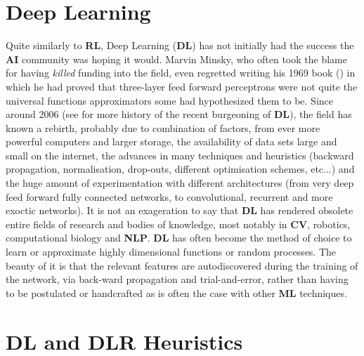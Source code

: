 \section{Deep Learning}

Quite similarly to \textbf{RL}, Deep Learning (\textbf{DL}) has not initially had the success the \textbf{AI} community was hoping it would. Marvin Minsky, who often took the blame for having \textit{killed} funding into the field, even regretted writing his 1969 book (\cite{minskypapert69}) in which he had proved that three-layer feed forward perceptrons were not quite the universal functions approximators some had hypothesized them to be. Since around 2006 (see \cite{GoodBengCour16} for more history of the recent burgeoning of \textbf{DL}), the field has known a rebirth, probably due to combination of factors, from ever more powerful computers and larger storage, the availability of data sets large and small on the internet, the advances in many techniques and heuristics (backward propagation, normalisation, drop-outs, different optimisation schemes, etc...) and the huge amount of experimentation with different architectures (from very deep feed forward fully connected networks, to convolutional, recurrent and more exoctic networks). It is not an exageration to say that \textbf{DL} has rendered obsolete entire fields of research and bodies of knowledge, most notably in \textbf{CV}, robotics, computational biology and \textbf{NLP}. \textbf{DL} has often become the method of choice to learn or approximate highly dimensional functions or random processes. The beauty of it is that the relevant features are autodiscovered during the training of the network, via back-ward propagation and trial-and-error, rather than having to be postulated or handcrafted as is often the case with other \textbf{ML} techniques.


\section{DL and DLR Heuristics}

